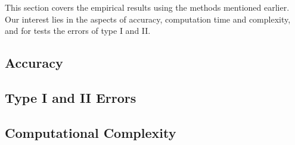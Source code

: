 This section covers the empirical results using the methods mentioned earlier. Our interest lies in the aspects of accuracy, computation time and complexity, and for tests the errors of type I and II. 
\subsection{Accuracy}

\subsection{Type I and II Errors}

\subsection{Computational Complexity}